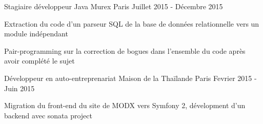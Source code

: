 \begin{cventries}

\cventry
{Stagiaire développeur Java}
{Murex}
{Paris}
{Juillet 2015 - Décembre 2015}
{
	\begin{cvitems}
	\item{Extraction du code d'un parseur SQL de la base de données relationnelle vers un module indépendant}
	\item{Pair-programming sur la correction de bogues dans l'ensemble du code après avoir complété le sujet}
	\end{cvitems}
}

\cventry
{Développeur en auto-entreprenariat}
{Maison de la Thaïlande}
{Paris}
{Fevrier 2015 - Juin 2015}
{
	\begin{cvitems}
	\item{Migration du front-end du site de MODX vers Symfony 2, dévelopment d'un backend avec sonata project}
	\end{cvitems}
}


\end{cventries}